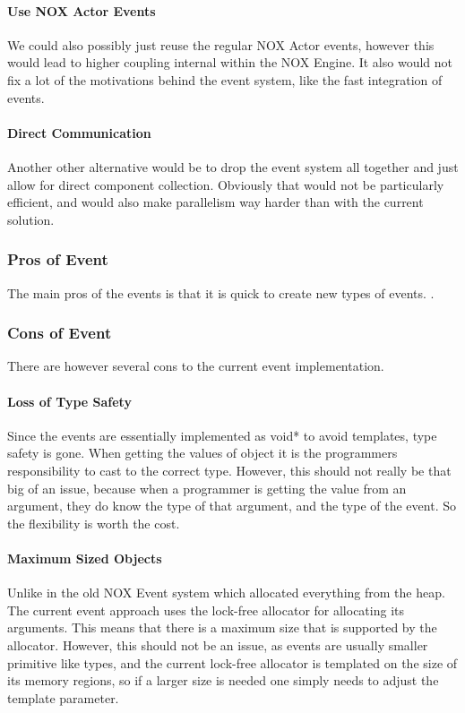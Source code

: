 \paragraph{Use NOX Actor Events}
We could also possibly just reuse the regular NOX Actor events,
however this would lead to higher coupling internal within the NOX Engine.
It also would not fix a lot of the motivations behind the event system,
like the fast integration of events.

\paragraph{Direct Communication}
Another other alternative would be to drop the event system all together and
just allow for direct component collection. Obviously that would not be particularly
efficient, and would also make parallelism way harder than with the current solution.

\subsubsection{Pros of Event}
The main pros of the events is that it is quick to create new types of events.
.

\subsubsection{Cons of Event}
There are however several cons to the current event implementation.

\paragraph{Loss of Type Safety}
Since the events are essentially implemented as void* to avoid templates,
type safety is gone. When getting the values of object it is the programmers
responsibility to cast to the correct type.
However, this should not really be that big of an issue, because when a programmer
is getting the value from an argument, they do know the type of that argument,
and the type of the event. So the flexibility is worth the cost.

\paragraph{Maximum Sized Objects}
Unlike in the old NOX Event system which allocated everything from the heap.
The current event approach uses the lock-free allocator
for allocating its arguments.
This means that there is a maximum size that is supported by the allocator.
However, this should not be an issue, as events are usually smaller primitive like types,
and the current lock-free allocator is templated on the size of its memory regions,
so if a larger size is needed one simply needs to adjust the template parameter.

